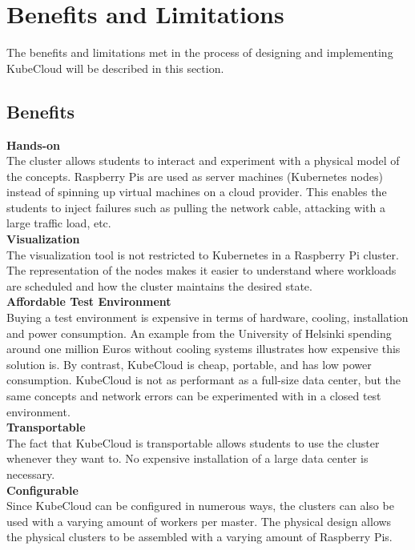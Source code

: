 
\section{Benefits and Limitations}
The benefits and limitations met in the process of designing and implementing KubeCloud will be described in this section.

\subsection*{Benefits}
\textbf{Hands-on} \\
The cluster allows students to interact and experiment with a physical model of the concepts. Raspberry Pis are used as server machines (Kubernetes nodes) instead of spinning up virtual machines on a cloud provider. This enables the students to inject failures such as pulling the network cable, attacking with a large traffic load, etc. \\

\noindent \textbf{Visualization} \\
The visualization tool is not restricted to Kubernetes in a Raspberry Pi cluster. The representation of the nodes makes it easier to understand where workloads are scheduled and how the cluster maintains the desired state. \\

\noindent \textbf{Affordable Test Environment} \\
Buying a test environment is expensive in terms of hardware, cooling, installation and power consumption. An example from the University of Helsinki spending around one million Euros without cooling systems \cite[p. 170-171]{abrahamsson2013bolzano} illustrates how expensive this solution is. By contrast, KubeCloud is cheap, portable, and has low power consumption. KubeCloud is not as performant as a full-size data center, but the same concepts and network errors can be experimented with in a closed test environment. \\

\noindent \textbf{Transportable} \\
The fact that KubeCloud is transportable allows students to use the cluster whenever they want to. No expensive installation of a large data center is necessary. \\

\noindent \textbf{Configurable} \\
Since KubeCloud can be configured in numerous ways, the clusters can also be used with a varying amount of workers per master. The physical design allows the physical clusters to be assembled with a varying amount of Raspberry Pis. \\


